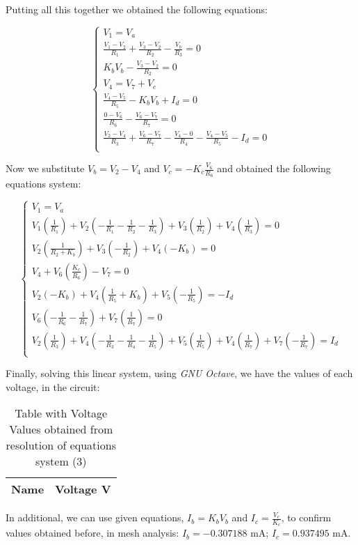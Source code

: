 Putting all this together we obtained the following equations:

\begin{equation}
\begin{cases}
V_1=V_a\\
\frac{V_1-V_2}{R_1} + \frac{V_3-V_2}{R_2} - \frac{V_b}{R_3}=0\\
K_bV_b - \frac{V_3-V_2}{R_2}=0\\
V_4= V_7+V_c\\

\frac{V_4-V_5}{R_5} - K_bV_b + I_d=0\\

\frac{0-V_6}{R_6} - \frac{V_6-V_7}{R_7} = 0\\
\frac{V_2-V_4}{R_3} + \frac{V_6-V_7}{R_7} - \frac{V_4-0}{R_4}-\frac{V_4-V_5}{R_5}-I_d=0\\
\end{cases}
\end{equation}

Now we substitute $V_b=V_2-V_4$ and $V_c=-K_c\frac{V_6}{R_6}$ and obtained the following equations system:

\begin{equation}
\begin{cases}
V_1=V_a\\
V_1(\frac{1}{R_1})+V_2(-\frac{1}{R_1}-\frac{1}{R_2}-\frac{1}{R_3})+V_3(\frac{1}{R_2})+V_4(\frac{1}{R_3})=0\\
V_2(\frac{1}{R_2+K_b})+V_3(-\frac{1}{R_2})+V_4(-K_b)=0\\
V_4+ V_6(\frac{K_c}{R_6})- V_7= 0\\
V_2(-K_b)+V_4(\frac{1}{R_5}+K_b)+V_5(-\frac{1}{R_5})= -I_d\\
V_6(-\frac{1}{R_6}-\frac{1}{R_7})+V_7(\frac{1}{R_7})= 0\\
V_2(\frac{1}{R_3})+V_4(-\frac{1}{R_3}-\frac{1}{R_4}-\frac{1}{R_5})+V_5(\frac{1}{R_5})+V_4(\frac{1}{R_7})+V_7(-\frac{1}{R_7})=I_d\\
\end{cases}
\end{equation}

Finally, solving this linear system, using \textit{GNU Octave}, we have the values of each voltage, in the circuit:

\begin{table}[h]
  \centering
  \begin{tabular}{|l|r|}
    \hline    
    {\bf Name} & {\bf Voltage V} \\ \hline
    
 \end{tabular}
 \caption{Table with Voltage Values obtained from resolution of equations system (3)}
  \label{tab:op}
\end{table}

In additional, we can use given equations, $I_b=K_bV_b$ and $I_c=\frac{V_c}{K_c}$, to confirm values obtained before, in mesh analysis: $I_b=-0.307188$ mA; $I_c=0.937495$ mA.






